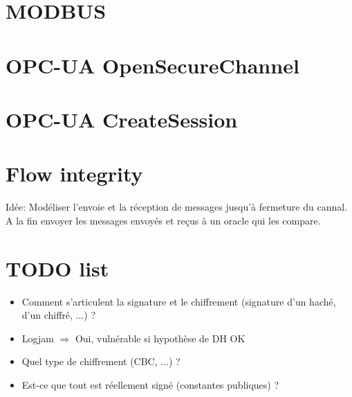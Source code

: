 \documentclass{article}
\newcommand{\opcua}{OPC-UA\xspace}
\newcommand{\modbus}{MODBUS\xspace}
\begin{document}
%
%
%

\section{\modbus}


\section{\opcua OpenSecureChannel}


\section{\opcua CreateSession}


\section{Flow integrity}
Idée: Modéliser l'envoie et la réception de messages jusqu'à fermeture du cannal.
A la fin envoyer les messages envoyés et reçus à un oracle qui les compare.

\section{TODO list}

\begin{itemize}
    \item Comment s'articulent la signature et le chiffrement (signature d'un haché, d'un chiffré, ...) ?
    \item Logjam $\Rightarrow$ Oui, vulnérable si hypothèse de DH OK
    \item Quel type de chiffrement (CBC, ...) ?
    \item Est-ce que tout est réellement signé (constantes publiques) ?
\end{itemize}
\end{document}
